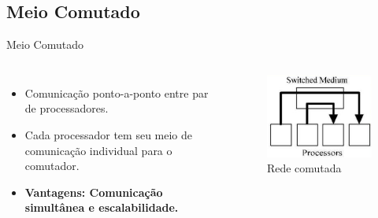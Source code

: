 \subsection{Meio Comutado}

\begin{frame}{Meio Comutado}
    \begin{columns}
            \begin{itemize}
                \item Comunicação ponto-a-ponto entre par de processadores.
                \medskip
                \item Cada processador tem seu meio de comunicação individual para o comutador.
                \medskip
                \item {\color{seagreen}\textbf{Vantagens: Comunicação simultânea e escalabilidade.}}
            \end{itemize}
            \begin{figure}[H]
                \centering
                \includegraphics[width=1\linewidth]{img/redes_de_interconexao/switced}
                \caption{Rede comutada}
            \label{fig:sitced}
        \end{figure}
    \end{columns}
\end{frame}


